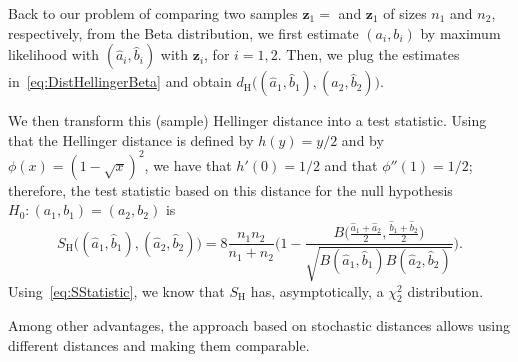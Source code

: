 \documentclass[12pt]{article}
\begin{document}
Back to our problem of comparing two samples $\bm z_1=$ and $\bm z_1$ of sizes $n_1$ and $n_2$, respectively, from the Beta distribution, we first estimate $(a_i,b_i)$ by maximum likelihood with $(\widehat a_i, \widehat b_i)$ with $\bm z_i$, for $i=1,2$.
Then, we plug the estimates in~\eqref{eq:DistHellingerBeta} and obtain
$d_{\text{H}}\big((\widehat a_1, \widehat b_1),(\widehat a_2, \widehat b_2)\big)$.

We then transform this (sample) Hellinger distance into a test statistic.
Using that the Hellinger distance is defined by $h(y)=y/2$ and by $\phi(x)=(1-\sqrt{x})^2$, we have that $h'(0)=1/2$ and that $\phi''(1)=1/2$; therefore, the test statistic based on this distance for the null hypothesis $H_0:(a_1,b_1)=(a_2,b_2)$ is
\begin{equation}
S_{\text{H}}\big((\widehat a_1, \widehat b_1),(\widehat a_2, \widehat b_2)\big) =
8\frac{n_1n_2}{n_1+n_2} \Bigg(
1- \frac{B\big(\frac{\widehat a_1+\widehat a_2}{2},\frac{\widehat b_1+\widehat b_2}{2}\big)}{\sqrt{B(\widehat a_1,\widehat b_1)B(\widehat a_2,\widehat b_2)}}
	\Bigg).
\end{equation}
Using~\eqref{eq:SStatistic}, we know that $S_{\text{H}}$ has, asymptotically, a $\chi^2_2$ distribution.

Among other advantages, the approach based on stochastic distances allows using different distances and making them comparable.



\end{document}
